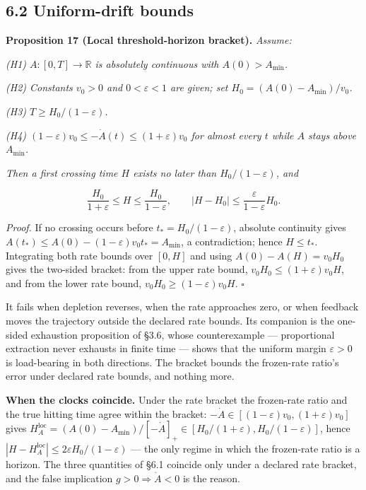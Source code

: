 \documentclass[11pt]{article}
\begin{document}
\subsection*{6.2 Uniform-drift bounds}\label{62-uniform-drift-bounds}

\textbf{Proposition 17 (Local threshold-horizon bracket).} \emph{Assume:}

\emph{(H1) \(A : [0,T] \to \mathbb{R}\) is absolutely continuous with \(A(0) > A_{\min}\).}

\emph{(H2) Constants \(v_0 > 0\) and \(0 < \varepsilon < 1\) are given; set \(H_0 = (A(0) - A_{\min})/v_0\).}

\emph{(H3) \(T \ge H_0/(1-\varepsilon)\).}

\emph{(H4) \((1-\varepsilon)v_0 \le -\dot A(t) \le (1+\allowbreak{}\varepsilon)v_0\) for almost every \(t\) while \(A\) stays above \(A_{\min}\).}

\emph{Then a first crossing time \(H\) exists no later than \(H_0/(1-\varepsilon)\), and} 

$$\frac{H_0}{1+\varepsilon} \le H \le \frac{H_0}{1-\varepsilon}, \qquad |H - H_0| \le \frac{\varepsilon}{1-\varepsilon}H_0.$$



\emph{Proof.} If no crossing occurs before \(t_* = H_0/(1-\varepsilon)\), absolute continuity gives \(A(t_*) \le A(0) - (1-\varepsilon)v_0 t_* =\allowbreak{} A_{\min}\), a contradiction; hence \(H \le t_*\). Integrating both rate bounds over \([0,H]\) and using \(A(0) - A(H) = v_0 H_0\) gives the two-sided bracket: from the upper rate bound, \(v_0 H_0 \le (1+\allowbreak{}\varepsilon) v_0 H\), and from the lower rate bound, \(v_0 H_0 \ge (1-\varepsilon) v_0 H\). \(\square\)

It fails when depletion reverses, when the rate approaches zero, or when feedback moves the trajectory outside the declared rate bounds. Its companion is the one-sided exhaustion proposition of \S3.6, whose counterexample --- proportional extraction never exhausts in finite time --- shows that the uniform margin \(\varepsilon>0\) is load-bearing in both directions. The bracket bounds the frozen-rate ratio's error under declared rate bounds, and nothing more.

\textbf{When the clocks coincide.} Under the rate bracket the frozen-rate ratio and the true hitting time agree within the bracket: \(-\dot A \in [(1-\varepsilon)v_0,\allowbreak{} (1+\allowbreak{}\varepsilon)v_0]\) gives \(H_A^{\mathrm{loc}} =\allowbreak{} (A(0) - A_{\min})/[-\dot A]_+\allowbreak{} \in [H_0/(1+\allowbreak{}\varepsilon),\allowbreak{} H_0/(1-\varepsilon)]\), hence \(|H - H_A^{\mathrm{loc}}| \le 2\varepsilon H_0/(1-\varepsilon)\) --- the only regime in which the frozen-rate ratio is a horizon. The three quantities of \S6.1 coincide only under a declared rate bracket, and the false implication \(g>0\Rightarrow\dot A<0\) is the reason.
\end{document}
